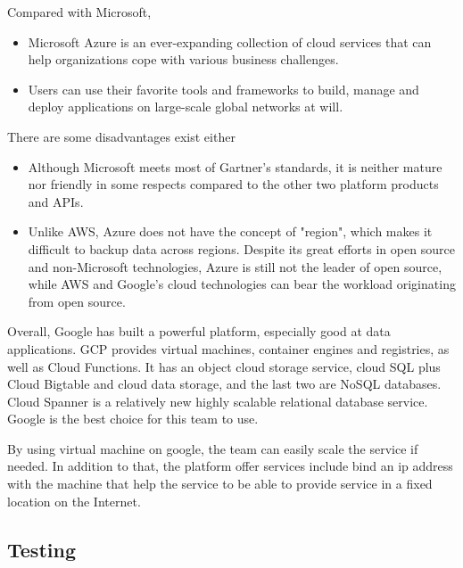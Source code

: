 \documentclass{article}
\begin{document}
Compared with Microsoft, 
\begin{itemize}
    \item Microsoft Azure is an ever-expanding collection of cloud services that can help organizations cope with various business challenges. 
    \item Users can use their favorite tools and frameworks to build, manage and deploy applications on large-scale global networks at will.
\end{itemize}
There are some disadvantages exist either
\begin{itemize} 
    \item Although Microsoft meets most of Gartner's standards, it is neither mature nor friendly in some respects compared to the other two platform products and APIs.
    \item Unlike AWS, Azure does not have the concept of "region", which makes it difficult to backup data across regions. Despite its great efforts in open source and non-Microsoft technologies, Azure is still not the leader of open source, while AWS and Google's cloud technologies can bear the workload originating from open source.\cite{c8}
   
\end{itemize}

Overall, Google has built a powerful platform, especially good at data applications. GCP provides virtual machines, container engines and registries, as well as Cloud Functions. It has an object cloud storage service, cloud SQL plus Cloud Bigtable and cloud data storage, and the last two are NoSQL databases. Cloud Spanner is a relatively new highly scalable relational database service. Google is the best choice for this team to use.

By using virtual machine on google, the team can easily scale the service if needed. In addition to that, the platform offer services include bind an ip address with the machine that help the service to be able to provide service in a fixed location on the Internet.

\subsection {Testing}
\end{document}
